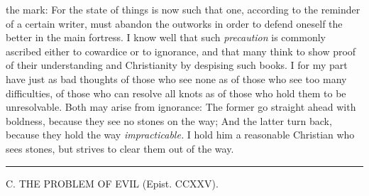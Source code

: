 \documentclass[12pt,a4paper,openany]{book}
\newcommand{\excerpthead}[1]{\par\bigskip\begin{center}#1\end{center}\nopagebreak\smallskip}
\newcommand{\sectionrule}{\par\begin{center}\rule{4em}{0.4pt}\end{center}}
\begin{document}
the mark: For the state of things is now such that one, according to the
reminder of a certain writer, must abandon the outworks in order to defend
oneself the better in the main fortress. I know well that such
\textit{precaution} is commonly ascribed either to cowardice or to ignorance, and
that many think to show proof of their understanding and Christianity by despising
such books. I for my part have just as bad thoughts of those who see none as of
those who see too many difficulties, of those who can resolve all knots as of
those who hold them to be unresolvable. Both may arise from ignorance: The
former go straight ahead with boldness, because they see no stones on the way;
And the latter turn back, because they hold the way
\textit{impracticable.} I hold him a reasonable Christian who sees stones, but
strives to clear them out of the way.

\sectionrule

\excerpthead{C. THE PROBLEM OF EVIL (Epist. CCXXV).}
\end{document}
